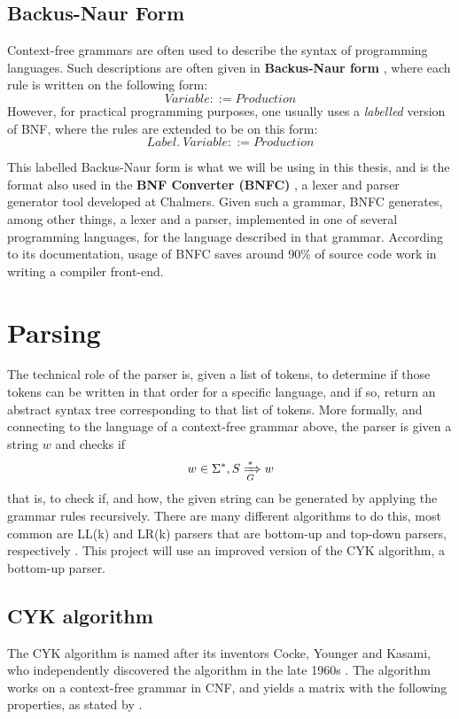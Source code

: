 \documentclass[a4paper,12pt,notitlepage]{report}
\renewcommand\cite{\citep}
\begin{document}
\subsection{Backus-Naur Form}
Context-free grammars are often used to describe the syntax of programming
languages. Such descriptions are often given in \textbf{Backus-Naur
form} \cite{backusform}, where each rule is written on the following form:
\[
Variable ::= Production 
\]
However, for practical programming purposes, one usually uses a
\textit{labelled} version of BNF, where the rules are extended to be on this
form:
\[
Label.\ Variable ::= Production 
\]

This labelled Backus-Naur form is what we will be using in this thesis, and is
the format also used in the \textbf{BNF Converter (BNFC)} \cite{bnfc}, a lexer
and parser generator tool developed at Chalmers.  Given such a grammar, BNFC
generates, among other things, a lexer and a parser, implemented in one of
several programming languages, for the language described in that grammar.
According to its documentation, usage of BNFC saves around 90\% of source code
work in writing a compiler front-end. 

\section{Parsing}
\label{parsingsection}
The technical role of the parser is, given a list of tokens, to determine if
those tokens can be written in that order for a specific language, and if so,
return an abstract syntax tree corresponding to that list of tokens. More
formally, and connecting to the language of a context-free grammar above, the
parser is given a string $w$ and checks if 
\[
w \in \Sigma^*, S \xRightarrow[G]{*} w
\]
that is, to check if, and how, the given string can be generated by applying the
grammar rules recursively. There are many different algorithms to do this, most
common are LL(k) and LR(k) parsers that are bottom-up and top-down parsers,
respectively \cite[p.192]{dragonbook}. This project will use an improved version
of the CYK algorithm, a bottom-up parser.

\subsection{CYK algorithm}
The CYK algorithm is named after its inventors Cocke, Younger and Kasami, who
independently discovered the algorithm in the late 1960s \cite{Younger67}. The
algorithm works on a context-free grammar in CNF, and yields a matrix with the
following properties, as stated by \citet{Younger67}.
\end{document}
